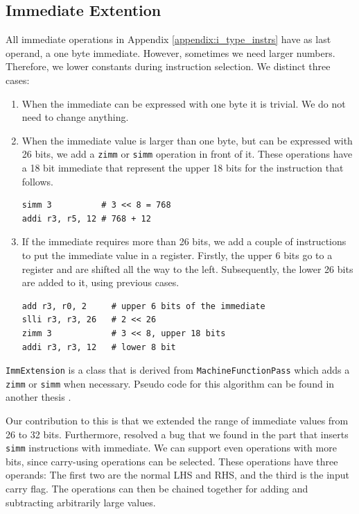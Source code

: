 
\subsection{Immediate Extention}\label{sec:immediate_ext}
All immediate operations in Appendix \ref{appendix:i_type_instrs} have as last operand, a one byte immediate. However, sometimes we need larger numbers. Therefore, we lower constants during instruction selection. We distinct three cases:
\begin{enumerate}
\item When the immediate can be expressed with one byte it is trivial. We do not need to change anything.
\item When the immediate value is larger than one byte, but can be expressed with 26 bits, we add a \texttt{zimm} or \texttt{simm} operation in front of it. These operations have a 18 bit immediate that represent the upper 18 bits for the instruction that follows.

\begin{lstlisting}
simm 3          # 3 << 8 = 768
addi r3, r5, 12 # 768 + 12
\end{lstlisting}
\item If the immediate requires more than 26 bits, we add a couple of instructions to put the immediate value in a register. Firstly, the upper 6 bits go to a register and are shifted all the way to the left. Subsequently, the lower 26 bits are added to it, using previous cases.
\begin{lstlisting}
add r3, r0, 2     # upper 6 bits of the immediate
slli r3, r3, 26   # 2 << 26
zimm 3            # 3 << 8, upper 18 bits
addi r3, r3, 12   # lower 8 bit
\end{lstlisting}
\end{enumerate}

\texttt{ImmExtension} is a class that is derived from \texttt{MachineFunctionPass} which adds a \texttt{zimm} or \texttt{simm} when necessary. Pseudo code for this algorithm can be found in another thesis \cite[Appendix B]{liu_zhenyuan}. 

Our contribution to this is that we extended the range of immediate values from 26 to 32 bits. Furthermore, resolved a bug that we found in the part that inserts \texttt{simm} instructions with immediate. We can support even operations with more bits, since carry-using operations can be selected. These operations have three operands: The first two are the normal LHS and RHS, and the third is the input carry flag. The operations can then be chained together for adding and subtracting arbitrarily large values.

